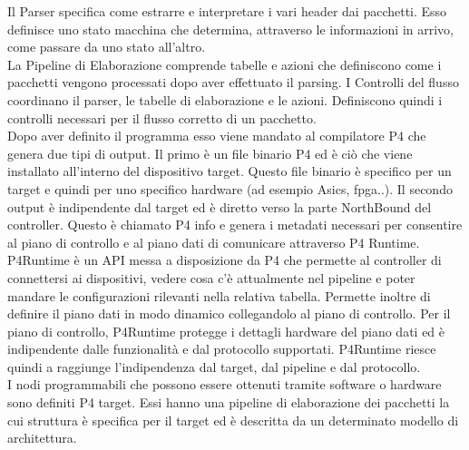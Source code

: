 Il Parser specifica come estrarre e interpretare i vari header dai pacchetti. Esso definisce uno stato macchina che determina, attraverso le informazioni in arrivo, come passare da uno stato all'altro. 
\\La Pipeline di Elaborazione comprende tabelle e azioni che definiscono come i pacchetti vengono processati dopo aver effettuato il parsing.
I Controlli del flusso coordinano il parser, le tabelle di elaborazione e le azioni. Definiscono quindi i controlli necessari per il flusso corretto di un pacchetto.
\\Dopo aver definito il programma esso viene mandato al compilatore P4 che genera due tipi di output. 
Il primo è un file binario P4 ed è ciò che viene installato all'interno del dispositivo target.
Questo file binario è specifico per un target e quindi per uno specifico hardware (ad esempio Asics, fpga..).
Il secondo output è indipendente dal target ed è diretto verso la parte NorthBound del controller. Questo è chiamato P4 info e genera i metadati necessari per consentire al piano di controllo e al piano
dati di comunicare attraverso P4 Runtime.
\\P4Runtime è un API messa a disposizione da P4 che permette al controller di connettersi ai dispositivi, vedere cosa c'è attualmente nel pipeline 
e poter mandare le configurazioni rilevanti nella relativa tabella. Permette inoltre di definire il piano dati in modo dinamico collegandolo al piano di controllo. 
Per il piano di controllo, P4Runtime protegge i dettagli hardware del piano dati ed è indipendente dalle funzionalità e dal protocollo supportati.
P4Runtime riesce quindi a raggiunge l'indipendenza dal target, dal pipeline e dal protocollo.
\\I nodi programmabili che possono essere ottenuti tramite software o hardware sono definiti P4 target.
Essi hanno una pipeline di elaborazione dei pacchetti la cui struttura è specifica per il target ed è descritta da un determinato modello di architettura.

